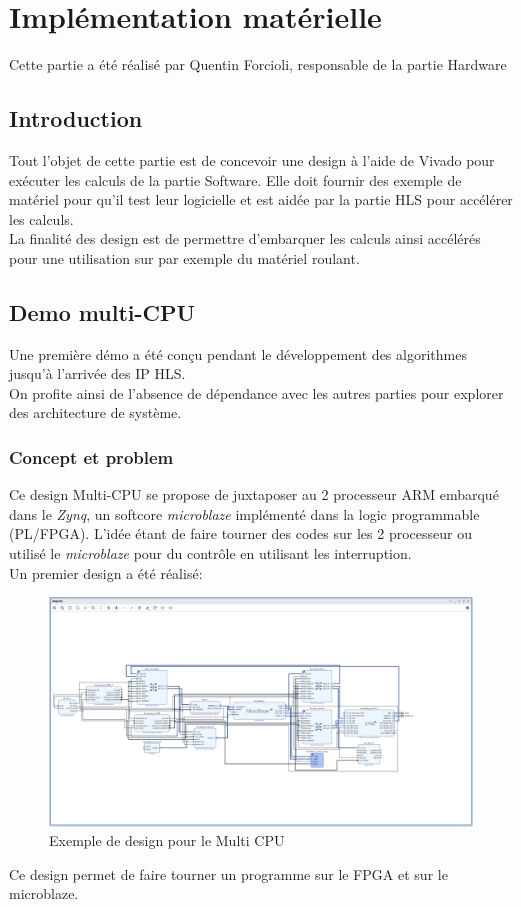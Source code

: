 \documentclass[12pt,a4paper]{article}
\begin{document}

\newpage
\pagestyle{fancy}
\section{Implémentation matérielle}
Cette partie a été réalisé par Quentin Forcioli, responsable de la partie Hardware
\subsection{Introduction}
Tout l'objet de cette partie est de concevoir une design à l'aide de Vivado pour exécuter les calculs de la partie Software. Elle doit fournir des exemple de matériel pour qu'il test leur logicielle et est aidée par la partie HLS pour accélérer les calculs.\\
La finalité des design est de permettre d'embarquer les calculs ainsi accélérés pour une utilisation sur par exemple du matériel roulant.
\subsection{Demo multi-CPU}
Une première démo a été conçu pendant le développement des algorithmes jusqu'à l'arrivée des IP HLS. \\
On profite ainsi de l'absence de dépendance avec les autres parties pour explorer des architecture de système.
\subsubsection{Concept et problem}
Ce design Multi-CPU se propose de juxtaposer au 2 processeur ARM embarqué dans le \textit{Zynq}, un softcore \textit{microblaze} implémenté dans la logic programmable (PL/FPGA). 
L'idée étant de faire tourner des codes sur les 2 processeur ou utilisé le \textit{microblaze} pour du contrôle en utilisant les interruption.
\\
Un premier design a été réalisé:
\begin{figure}[H]
	\centering
		\includegraphics[width=\linewidth]{im/mb1.png}	
	\caption{Exemple de design pour le Multi CPU}
	\label{fig-mb}
\end{figure}
Ce design permet de faire tourner un programme sur le FPGA et sur le microblaze.
\end{document}
